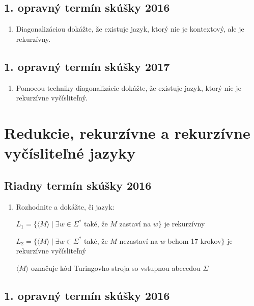\documentclass[11pt,a4paper]{article}
\begin{document}
		\subsection{1. opravný termín skúšky 2016}
		
		\begin{enumerate}
			\item Diagonalizáciou dokážte, že existuje jazyk, ktorý nie je kontextový, ale je rekurzívny.
		\end{enumerate}

		\subsection{1. opravný termín skúšky 2017}

		\begin{enumerate}
			\item Pomocou techniky diagonalizácie dokážte, že existuje jazyk, ktorý nie je rekurzívne vyčísliteľný.
		\end{enumerate}
	
	\section{Redukcie, rekurzívne a rekurzívne vyčísliteľné jazyky}
	
		\subsection{Riadny termín skúšky 2016}
		
		\begin{enumerate}
			\item Rozhodnite a dokážte, či jazyk:
			
			$L_1 = \{\langle M \rangle \mid \exists w \in \Sigma^*$ také, že $M$ zastaví na $w\}$ je rekurzívny
			
			$L_2 = \{\langle M \rangle \mid \exists w \in \Sigma^*$ také, že $M$ nezastaví na $w$ behom 17 krokov$\}$ je rekurzívne vyčísliteľný
			
			$\langle M \rangle$ označuje kód Turingovho stroja so vstupnou abecedou $\Sigma$
		\end{enumerate}	
		
		\subsection{1. opravný termín skúšky 2016}
		
\end{document}
